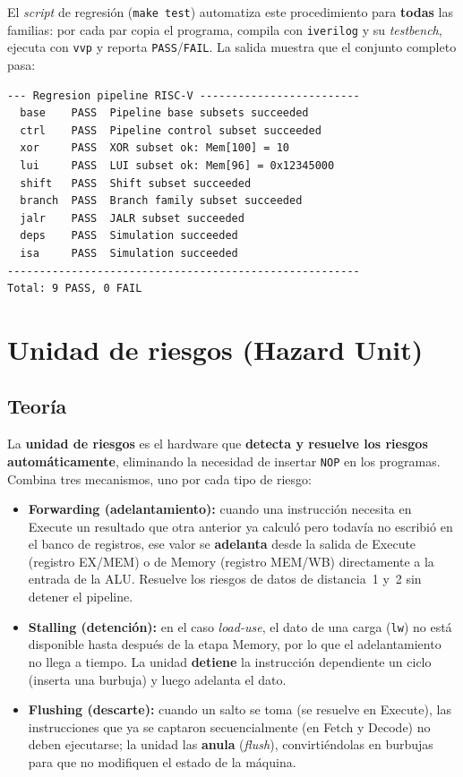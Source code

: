 \documentclass[11pt,a4paper]{article}
\begin{document}
El \textit{script} de regresión (\texttt{make test}) automatiza este procedimiento para
\textbf{todas} las familias: por cada par copia el programa, compila con
\texttt{iverilog} y su \textit{testbench}, ejecuta con \texttt{vvp} y reporta
\texttt{PASS}/\texttt{FAIL}. La salida muestra que el conjunto completo pasa:

\noindent\begin{minipage}{\linewidth}
	\begin{lstlisting}[language={}]
--- Regresion pipeline RISC-V -------------------------
  base    PASS  Pipeline base subsets succeeded
  ctrl    PASS  Pipeline control subset succeeded
  xor     PASS  XOR subset ok: Mem[100] = 10
  lui     PASS  LUI subset ok: Mem[96] = 0x12345000
  shift   PASS  Shift subset succeeded
  branch  PASS  Branch family subset succeeded
  jalr    PASS  JALR subset succeeded
  deps    PASS  Simulation succeeded
  isa     PASS  Simulation succeeded
-------------------------------------------------------
Total: 9 PASS, 0 FAIL
\end{lstlisting}
\end{minipage}

\section{Unidad de riesgos (Hazard Unit)}

\subsection{Teoría}

La \textbf{unidad de riesgos} es el hardware que \textbf{detecta y resuelve los riesgos
	automáticamente}, eliminando la necesidad de insertar \texttt{NOP} en los programas.
Combina tres mecanismos, uno por cada tipo de riesgo:

\begin{itemize}
	\item \textbf{Forwarding (adelantamiento):} cuando una instrucción necesita en Execute
	      un resultado que otra anterior ya calculó pero todavía no escribió en el banco
	      de registros, ese valor se \textbf{adelanta} desde la salida de Execute
	      (registro EX/MEM) o de Memory (registro MEM/WB) directamente a la entrada de la
	      ALU. Resuelve los riesgos de datos de distancia~1 y~2 sin detener el pipeline.
	\item \textbf{Stalling (detención):} en el caso \textit{load-use}, el dato de una carga
	      (\texttt{lw}) no está disponible hasta después de la etapa Memory, por lo que el
	      adelantamiento no llega a tiempo. La unidad \textbf{detiene} la instrucción
	      dependiente un ciclo (inserta una burbuja) y luego adelanta el dato.
	\item \textbf{Flushing (descarte):} cuando un salto se toma (se resuelve en Execute),
	      las instrucciones que ya se captaron secuencialmente (en Fetch y Decode) no deben
	      ejecutarse; la unidad las \textbf{anula} (\textit{flush}), convirtiéndolas en
	      burbujas para que no modifiquen el estado de la máquina.
\end{itemize}
\end{document}
